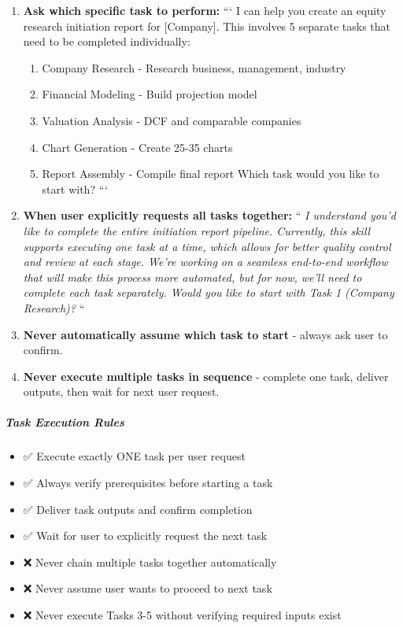 \documentclass[11pt]{article}
\begin{document}
\begin{enumerate}[leftmargin=*,itemsep=2pt,topsep=2pt]
\item {} \textbf{Ask which specific task to perform:} ``` I can help you create an equity research initiation report for [Company]. This involves 5 separate tasks that need to be completed individually:
\begin{enumerate}[leftmargin=*,itemsep=2pt,topsep=2pt]
\item {} Company Research - Research business, management, industry
\item {} Financial Modeling - Build projection model
\item {} Valuation Analysis - DCF and comparable companies
\item {} Chart Generation - Create 25-35 charts
\item {} Report Assembly - Compile final report Which task would you like to start with? ```
\end{enumerate}
\item {} \textbf{When user explicitly requests all tasks together:} ``\emph{ I understand you'd like to complete the entire initiation report pipeline. Currently, this skill supports executing one task at a time, which allows for better quality control and review at each stage. We're working on a seamless end-to-end workflow that will make this process more automated, but for now, we'll need to complete each task separately. Would you like to start with Task 1 (Company Research)? }``
\item {} \textbf{Never automatically assume which task to start} - always ask user to confirm.
\item {} \textbf{Never execute multiple tasks in sequence} - complete one task, deliver outputs, then wait for next user request.
\end{enumerate}

\subparagraph{Task Execution Rules}\mbox{}\par

\begin{itemize}[leftmargin=*,itemsep=2pt,topsep=2pt]
\item {} ✅ Execute exactly ONE task per user request
\item {} ✅ Always verify prerequisites before starting a task
\item {} ✅ Deliver task outputs and confirm completion
\item {} ✅ Wait for user to explicitly request the next task
\item {} ❌ Never chain multiple tasks together automatically
\item {} ❌ Never assume user wants to proceed to next task
\item {} ❌ Never execute Tasks 3-5 without verifying required inputs exist
\end{itemize}
\end{document}
